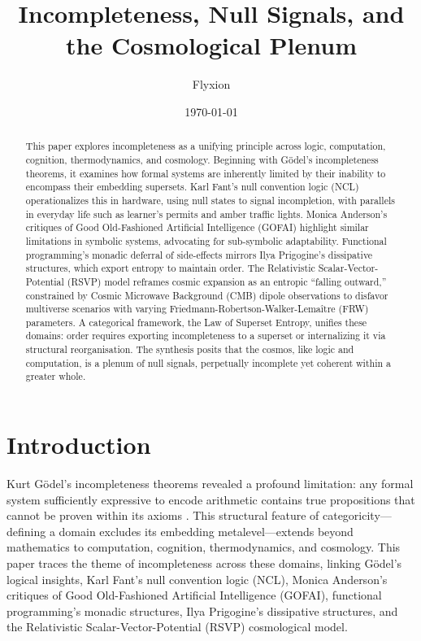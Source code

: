 \documentclass{article}
\begin{document}
\title{Incompleteness, Null Signals, and the Cosmological Plenum}
\author{Flyxion}
\date{\today}
\maketitle

\begin{abstract}
This paper explores incompleteness as a unifying principle across logic, computation, cognition, thermodynamics, and cosmology. Beginning with G\"{o}del's incompleteness theorems, it examines how formal systems are inherently limited by their inability to encompass their embedding supersets. Karl Fant's null convention logic (NCL) operationalizes this in hardware, using null states to signal incompletion, with parallels in everyday life such as learner's permits and amber traffic lights. Monica Anderson's critiques of Good Old-Fashioned Artificial Intelligence (GOFAI) highlight similar limitations in symbolic systems, advocating for sub-symbolic adaptability. Functional programming's monadic deferral of side-effects mirrors Ilya Prigogine's dissipative structures, which export entropy to maintain order. The Relativistic Scalar-Vector-Potential (RSVP) model reframes cosmic expansion as an entropic ``falling outward,'' constrained by Cosmic Microwave Background (CMB) dipole observations to disfavor multiverse scenarios with varying Friedmann-Robertson-Walker-Lema\^{i}tre (FRW) parameters. A categorical framework, the Law of Superset Entropy, unifies these domains: order requires exporting incompleteness to a superset or internalizing it via structural reorganisation. The synthesis posits that the cosmos, like logic and computation, is a plenum of null signals, perpetually incomplete yet coherent within a greater whole.
\end{abstract}

\section{Introduction}
\label{sec:intro}
Kurt G\"{o}del's incompleteness theorems revealed a profound limitation: any formal system sufficiently expressive to encode arithmetic contains true propositions that cannot be proven within its axioms \citep{godel1931}. This structural feature of categoricity---defining a domain excludes its embedding metalevel---extends beyond mathematics to computation, cognition, thermodynamics, and cosmology. This paper traces the theme of incompleteness across these domains, linking G\"{o}del's logical insights, Karl Fant's null convention logic (NCL), Monica Anderson's critiques of Good Old-Fashioned Artificial Intelligence (GOFAI), functional programming's monadic structures, Ilya Prigogine's dissipative structures, and the Relativistic Scalar-Vector-Potential (RSVP) cosmological model.
\end{document}
